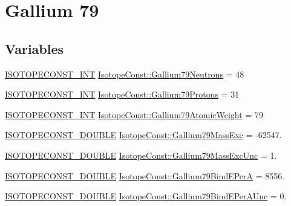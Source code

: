 \hypertarget{group___isotope_const-_gallium-_ga79}{}\section{Gallium 79}
\label{group___isotope_const-_gallium-_ga79}
\subsection*{Variables}
\begin{DoxyCompactItemize}
\item 
\mbox{\hyperlink{group___isotope_const-_macros_ga5f18360b3e99483a35c32d789e62621c}{I\+S\+O\+T\+O\+P\+E\+C\+O\+N\+S\+T\+\_\+\+I\+NT}} \mbox{\hyperlink{group___isotope_const-_gallium-_ga79_gade06789d018688fc6e7fba485a115c13}{Isotope\+Const\+::\+Gallium79\+Neutrons}} = 48
\item 
\mbox{\hyperlink{group___isotope_const-_macros_ga5f18360b3e99483a35c32d789e62621c}{I\+S\+O\+T\+O\+P\+E\+C\+O\+N\+S\+T\+\_\+\+I\+NT}} \mbox{\hyperlink{group___isotope_const-_gallium-_ga79_ga4bb20f7ddb22005c466320ba72ea1133}{Isotope\+Const\+::\+Gallium79\+Protons}} = 31
\item 
\mbox{\hyperlink{group___isotope_const-_macros_ga5f18360b3e99483a35c32d789e62621c}{I\+S\+O\+T\+O\+P\+E\+C\+O\+N\+S\+T\+\_\+\+I\+NT}} \mbox{\hyperlink{group___isotope_const-_gallium-_ga79_ga2dd60aeb88e02b59578ea30111477335}{Isotope\+Const\+::\+Gallium79\+Atomic\+Weight}} = 79
\item 
\mbox{\hyperlink{group___isotope_const-_macros_ga8f45a7272ce02c0b4c65c44636ed719a}{I\+S\+O\+T\+O\+P\+E\+C\+O\+N\+S\+T\+\_\+\+D\+O\+U\+B\+LE}} \mbox{\hyperlink{group___isotope_const-_gallium-_ga79_gad5855bd2180982f057cd7a3debd1edff}{Isotope\+Const\+::\+Gallium79\+Mass\+Exc}} = -\/62547.
\item 
\mbox{\hyperlink{group___isotope_const-_macros_ga8f45a7272ce02c0b4c65c44636ed719a}{I\+S\+O\+T\+O\+P\+E\+C\+O\+N\+S\+T\+\_\+\+D\+O\+U\+B\+LE}} \mbox{\hyperlink{group___isotope_const-_gallium-_ga79_gac39d5c724eaa549f3a262f0dff4aa819}{Isotope\+Const\+::\+Gallium79\+Mass\+Exc\+Unc}} = 1.
\item 
\mbox{\hyperlink{group___isotope_const-_macros_ga8f45a7272ce02c0b4c65c44636ed719a}{I\+S\+O\+T\+O\+P\+E\+C\+O\+N\+S\+T\+\_\+\+D\+O\+U\+B\+LE}} \mbox{\hyperlink{group___isotope_const-_gallium-_ga79_ga653df6a4b8a682f3f5a215d6b830aadb}{Isotope\+Const\+::\+Gallium79\+Bind\+E\+PerA}} = 8556.
\item 
\mbox{\hyperlink{group___isotope_const-_macros_ga8f45a7272ce02c0b4c65c44636ed719a}{I\+S\+O\+T\+O\+P\+E\+C\+O\+N\+S\+T\+\_\+\+D\+O\+U\+B\+LE}} \mbox{\hyperlink{group___isotope_const-_gallium-_ga79_gad8f17e7f1ff0ccd69e782af2e595d1e6}{Isotope\+Const\+::\+Gallium79\+Bind\+E\+Per\+A\+Unc}} = 0.

\end{DoxyCompactItemize}
